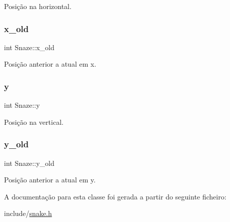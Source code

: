 Posição na horizontal. 

\mbox{\label{classSnaze_aab6383a16dddde062cece7fc239bfe89}} 
\subsubsection{\texorpdfstring{x\+\_\+old}{x\_old}}
{\footnotesize\ttfamily int Snaze\+::x\+\_\+old\hspace{0.3cm}{\ttfamily [private]}}



Posição anterior a atual em x. 

\mbox{\label{classSnaze_aa444c1837a1dd4ae9af946e26533df54}} 
\subsubsection{\texorpdfstring{y}{y}}
{\footnotesize\ttfamily int Snaze\+::y\hspace{0.3cm}{\ttfamily [private]}}



Posição na vertical. 

\mbox{\label{classSnaze_a89b6ed8b54d38796b79dbbe364e70180}} 
\subsubsection{\texorpdfstring{y\+\_\+old}{y\_old}}
{\footnotesize\ttfamily int Snaze\+::y\+\_\+old\hspace{0.3cm}{\ttfamily [private]}}



Posição anterior a atual em y. 



A documentação para esta classe foi gerada a partir do seguinte ficheiro\+:\begin{DoxyCompactItemize}
\item 
include/\hyperlink{snake_8h}{snake.\+h}\end{DoxyCompactItemize}
